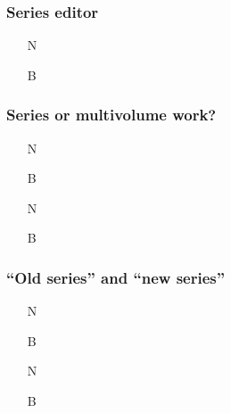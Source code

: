 \documentclass[11pt,letterpaper,oneside]{article}
\begin{document}
\subsubsection{Series editor}

\begin{itemize}
\item[N] 

\item[B] 
\end{itemize}

\subsubsection{Series or multivolume work?}
\label{14.130}

\begin{itemize}
\item[N] 

\item[B] 

\item[N] 

\item[B] 
\end{itemize}


\setcounter{subsubsection}{131}
\subsubsection{``Old series'' and ``new series''}
\label{14.132}

\begin{itemize}
\item[N] 

\item[B] 

\item[N] 

\item[B] 
\end{itemize}
\end{document}

